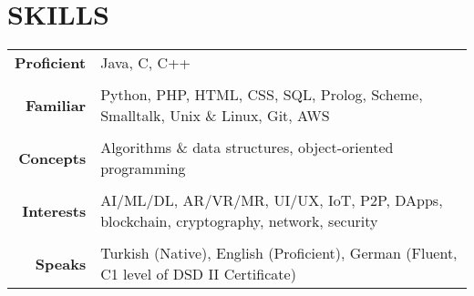 \documentclass[a4paper, 10pt]{article}
\begin{document}
\section{SKILLS}
{\renewcommand{\arraystretch}{0.7}
\begin{tabular}{r p{15.4cm}}
    \textbf{Proficient} & Java, C, C++\\\\
    \textbf{Familiar} & Python, PHP, HTML, CSS, SQL, Prolog, Scheme, Smalltalk, Unix \& Linux, Git, AWS\\\\
    \textbf{Concepts} & Algorithms \& data structures, object-oriented programming\\\\
    \textbf{Interests} & AI/ML/DL, AR/VR/MR, UI/UX, IoT, P2P, DApps, blockchain, cryptography, network, security\\\\
    \textbf{Speaks} & Turkish (Native), English (Proficient), German (Fluent, C1 level of DSD II Certificate)
\end{tabular}}
\end{document}
